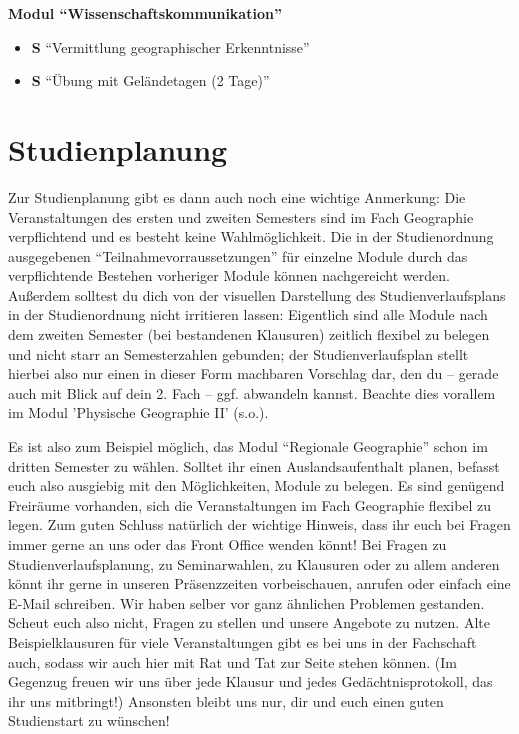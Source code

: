 \textbf{Modul "`Wissenschaftskommunikation"'}
\begin{itemize}
	\item \textbf{S} "`Vermittlung geographischer Erkenntnisse"' 
	\item \textbf{S} "`Übung mit Geländetagen (2 Tage)"' 
\end{itemize}

\section*{Studienplanung}
Zur Studienplanung gibt es dann auch noch eine wichtige Anmerkung:
Die Veranstaltungen des ersten und zweiten Semesters sind im Fach Geographie verpflichtend und es besteht keine Wahlmöglichkeit. Die in der Studienordnung ausgegebenen "`Teilnahmevorraussetzungen"' für einzelne Module durch das verpflichtende Bestehen vorheriger Module können nachgereicht werden. Außerdem solltest du dich von der visuellen Darstellung des Studienverlaufsplans in der Studienordnung nicht irritieren lassen: Eigentlich sind alle Module nach dem zweiten Semester (bei bestandenen Klausuren) zeitlich flexibel zu belegen und nicht starr an Semesterzahlen gebunden; der Studienverlaufsplan stellt hierbei also nur einen in dieser Form machbaren Vorschlag dar, den du -- gerade auch mit Blick auf dein 2. Fach -- ggf. abwandeln kannst. Beachte dies vorallem im Modul 'Physische Geographie II' (s.o.).

Es ist also zum Beispiel möglich, das Modul \enquote{Regionale Geographie} schon im dritten Semester zu wählen. Solltet ihr einen Auslandsaufenthalt planen, befasst euch also ausgiebig mit den Möglichkeiten, Module zu belegen. Es sind genügend Freiräume vorhanden, sich die Veranstaltungen im Fach Geographie flexibel zu legen. Zum guten Schluss natürlich der wichtige Hinweis, dass ihr euch bei Fragen immer gerne an uns oder das Front Office wenden könnt! Bei Fragen zu Studienverlaufsplanung, zu Seminarwahlen, zu Klausuren oder zu allem anderen könnt ihr gerne in unseren Präsenzzeiten vorbeischauen, anrufen oder einfach eine E-Mail schreiben. Wir haben selber vor ganz ähnlichen Problemen gestanden. Scheut euch also nicht, Fragen zu stellen und unsere Angebote zu nutzen. Alte Beispielklausuren für viele Veranstaltungen gibt es bei uns in der Fachschaft auch, sodass wir auch hier mit Rat und Tat zur Seite stehen können. (Im Gegenzug freuen wir uns über jede Klausur und jedes Gedächtnisprotokoll, das ihr uns mitbringt!) Ansonsten bleibt uns nur, dir und euch einen guten Studienstart zu wünschen!

